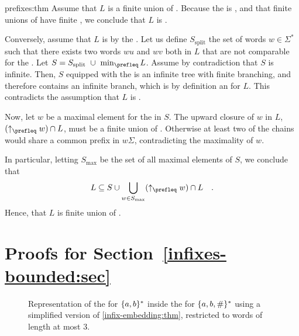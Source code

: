 \begin{proofof}{prefixes:thm}
    Assume that $L$ is a finite union of .
    Because the  is ,
    and that finite unions of  have finite ,
    we conclude that $L$ is .
    
    Conversely, assume that $L$ is  by the . Let us define $S_{\mathrm{split}}$ the set of words $w \in \Sigma^*$ 
    such that there exists
    two words $wu$ and $wv$ both in $L$ that are not comparable for the
    . Let $S = S_{\mathrm{split}}~\cup~\min_{\prefleq} L$. 
    Assume by contradiction that $S$ is infinite.
    Then, $S$ equipped with the  is an infinite
    tree with finite branching, and therefore contains an infinite
    branch, which is by definition an  for $L$.
    This contradicts the assumption that $L$ is .
    
    Now, let $w$ be a maximal element for the 
    in $S$. 
    The upward closure of $w$ in $L$, $(\upset[\prefleq]{w}) \cap L$, must be a 
    finite union of . Otherwise at least two of the chains would share a common 
    prefix in $w\Sigma$, contradicting the maximality of $w$.
    
    In particular, letting $S_{\max}$ be the set of all maximal elements
    of $S$,
    we conclude that 
    \begin{equation*}
        L \subseteq S \cup \bigcup_{w \in S_{\max}} (\upset[\prefleq]{w}) \cap L
        \quad .
    \end{equation*}
    Hence, that $L$ is finite union of .
\end{proofof}


\section{Proofs for Section~\ref{infixes-bounded:sec}}

\begin{figure}
    \centering
    
    \caption{Representation of the  for $\{ a,b \}^*$
        inside the  for $\{ a,b,\# \}^*$
        using a simplified version of \cref{infix-embedding:thm}, restricted to words
        of length at most $3$. 
    }
    \label{infix-embedding:fig}
\end{figure}


